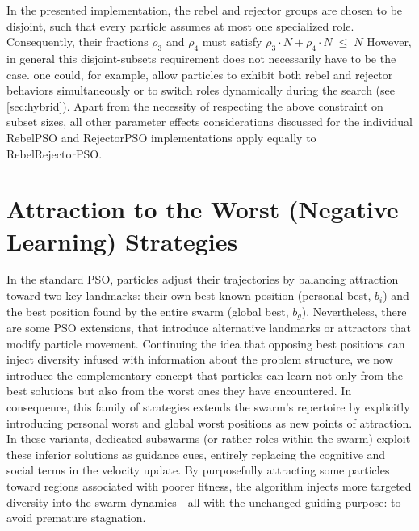 {In the presented implementation, the rebel and rejector groups are chosen to be disjoint, such that every particle assumes at most one specialized role. Consequently, their fractions 
$\rho_{3}$ and $\rho_{4}$
  must satisfy
$\rho_{3} \cdot N + \rho_{4} \cdot N \;\le\; N$
However, in general this disjoint-subsets requirement does not necessarily have to be the case. one could, for example, allow particles to exhibit both rebel and rejector behaviors simultaneously or to switch roles dynamically during the search (see \autoref{sec:hybrid}). Apart from the necessity of respecting the above constraint on subset sizes, all other parameter effects considerations discussed for the individual RebelPSO and RejectorPSO implementations apply equally to RebelRejectorPSO.







\section{Attraction to the Worst (Negative Learning) Strategies}\label{sec:negative}

In the standard PSO, particles adjust their trajectories by balancing attraction toward two key landmarks: their own best-known position (personal best, $b_i$) and the best position found by the entire swarm (global best, $b_g$). Nevertheless, there are some PSO extensions, that introduce alternative landmarks or attractors that modify particle movement.
Continuing the idea that opposing best positions can inject diversity infused with information about the problem structure, we now introduce the complementary concept that particles can learn not only from the best solutions but also from the worst ones they have encountered. In consequence, this family of strategies extends the swarm's repertoire by explicitly introducing personal worst and global worst positions as new points of attraction.
In these variants, dedicated subswarms (or rather roles within the swarm) exploit these inferior solutions as guidance cues, entirely replacing the cognitive and social terms in the velocity update.
By purposefully attracting some particles toward regions associated with poorer fitness, the algorithm injects more targeted diversity into the swarm dynamics---all with the unchanged guiding purpose: to avoid premature stagnation.


}
